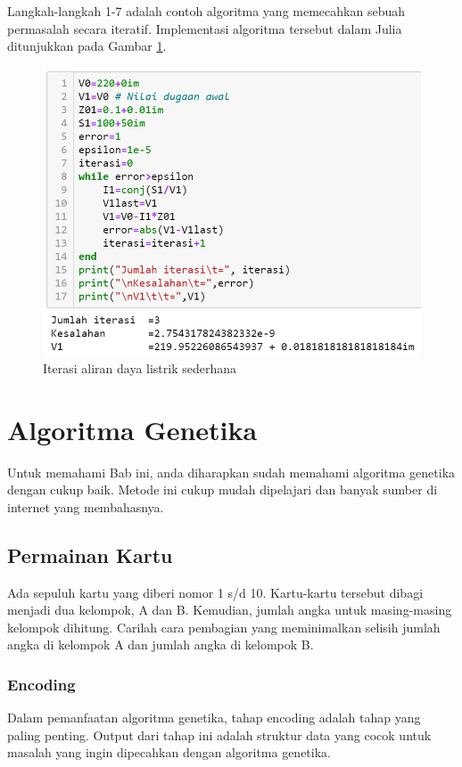 \documentclass[12pt,a4paper]{memoir}
\begin{document}
Langkah-langkah 1-7 adalah contoh algoritma yang memecahkan sebuah permasalah secara iteratif. Implementasi algoritma tersebut dalam Julia ditunjukkan pada Gambar \ref{fig:iterasi1}.
\begin{figure}
	\centering
	\includegraphics{images/iterasi1}
	\caption{Iterasi aliran daya listrik sederhana}
	\label{fig:iterasi1}
\end{figure}

\chapter{Algoritma Genetika}
Untuk memahami Bab ini, anda diharapkan sudah memahami algoritma genetika dengan cukup baik. Metode ini cukup mudah dipelajari dan banyak sumber di internet yang membahasnya.
\section{Permainan Kartu}
Ada sepuluh kartu yang diberi nomor 1 s/d 10. Kartu-kartu tersebut dibagi menjadi dua kelompok, A dan B. Kemudian, jumlah angka untuk masing-masing kelompok dihitung. Carilah cara pembagian yang meminimalkan selisih jumlah angka di kelompok A dan jumlah angka di kelompok B.
\subsection{Encoding}
Dalam pemanfaatan algoritma genetika, tahap encoding adalah tahap yang paling penting. Output dari tahap ini adalah struktur data yang cocok untuk masalah yang ingin dipecahkan dengan algoritma genetika.
\end{document}
